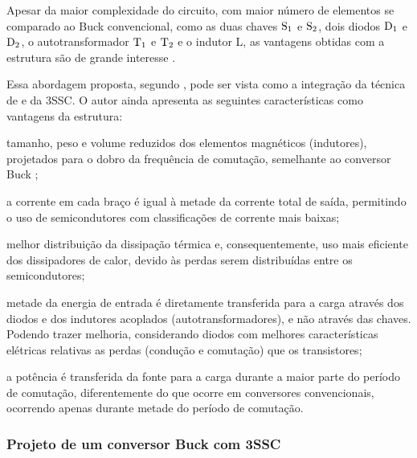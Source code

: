             Apesar da maior complexidade do circuito, com maior número de elementos se comparado ao Buck convencional, como as duas chaves $\text{S}_\text{1}$ e $\text{S}_\text{2}$, dois diodos $\text{D}_\text{1}$ e $\text{D}_\text{2}$, o autotransformador $\text{T}_\text{1}$ e $\text{T}_\text{2}$ e o indutor L, as vantagens obtidas com a estrutura são de grande interesse \cite{ref:BI_artigo_Falcondes}. 
            
            Essa abordagem proposta, segundo , pode ser vista como a integração da técnica de \interleaving e da 3SSC. O autor ainda apresenta as seguintes características como vantagens da estrutura:
            
            \begin{alineas}
                \item tamanho, peso e volume reduzidos dos elementos magnéticos (indutores), projetados para o dobro da frequência de comutação, semelhante ao conversor Buck \interleaved;
                
                \item a corrente em cada braço é igual à metade da corrente total de saída, permitindo o uso de semicondutores com classificações de corrente mais baixas;
                
                \item melhor distribuição da dissipação térmica e, consequentemente, uso mais eficiente dos dissipadores de calor, devido às perdas serem distribuídas entre os semicondutores;
                
                \item metade da energia de entrada é diretamente transferida para a carga através dos diodos e dos indutores acoplados (autotransformadores), e não através das chaves. Podendo trazer melhoria, considerando diodos com melhores características elétricas relativas as perdas (condução e comutação) que os transistores;
                
                \item a potência é transferida da fonte para a carga durante a maior parte do período de comutação, diferentemente do que ocorre em conversores convencionais, ocorrendo apenas durante metade do período de comutação.
            \end{alineas}
            
            \subsubsection{Projeto de um conversor Buck com 3SSC} \label{cap:fund_elp_3ssc_proj}
            
